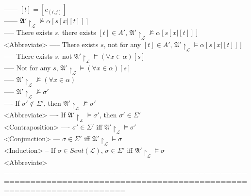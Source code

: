 \documentclass{book}
\newcommand{\inot}{\not}
\begin{document}
						------ $[t] = [c_{(i, j)}]$ \\
						------ $\mathfrak{A}' \upharpoonright_\mathcal{L} \inot \vDash \alpha[s[x|[t]]]$ \\
					----- There exists $s$, there exists $[t] \in A'$, $\mathfrak{A}' \upharpoonright_\mathcal{L} \inot \vDash \alpha[s[x|[t]]]$ \\ <Abbreviate>
					----- There exists $s$, not for any $[t] \in A'$, $\mathfrak{A}' \upharpoonright_\mathcal{L} \vDash \alpha[s[x|[t]]]$ \\
					----- There exists $s$, not $\mathfrak{A}' \upharpoonright_\mathcal{L} \vDash (\forall x \in \alpha)[s]$ \\
					----- Not for any $s$, $\mathfrak{A}' \upharpoonright_\mathcal{L} \vDash (\forall x \in \alpha)[s]$ \\
					----- $\mathfrak{A}' \upharpoonright_\mathcal{L} \inot \vDash (\forall x \in \alpha)$ \\
					----- $\mathfrak{A}' \upharpoonright_\mathcal{L} \inot \vDash \sigma'$ \\
				---- If $\sigma' \inot \in \Sigma'$, then $\mathfrak{A}' \upharpoonright_\mathcal{L} \inot \vDash \sigma'$ \\ <Abbreviate>
				---- If $\mathfrak{A}' \upharpoonright_\mathcal{L} \vDash \sigma'$, then $\sigma' \in \Sigma'$ \\ <Contraposition>
				---- $\sigma' \in \Sigma'$ iff $\mathfrak{A}' \upharpoonright_\mathcal{L} \vDash \sigma'$ \\ <Conjunction>
			--- $\sigma \in \Sigma'$ iff $\mathfrak{A}' \upharpoonright_\mathcal{L} \vDash \sigma$ \\ <Induction>
		-- If $\sigma \in Sent(\mathcal{L})$, $\sigma \in \Sigma'$ iff $\mathfrak{A}' \upharpoonright_\mathcal{L} \vDash \sigma$ \\ <Abbreviate>
	===================================================================================================================
\end{document}
